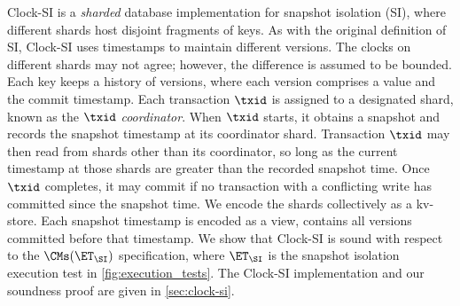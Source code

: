 Clock-SI is a \emph{sharded} database implementation for snapshot isolation (SI),
where different shards host disjoint fragments of keys.
As with the original definition of SI, Clock-SI uses timestamps to maintain different versions. 
The clocks on different shards may not agree; however, the difference is assumed to be bounded.
Each key keeps a history of versions, where each version comprises a value and the commit timestamp.
Each transaction $\txid$ is assigned to a designated shard, known as the $\txid$ \emph{coordinator}. 
When $\txid$ starts, it obtains a snapshot and records the snapshot timestamp at its coordinator shard.
Transaction $\txid$ may then read from shards other than its coordinator, so long as the current timestamp at those shards are greater than the recorded snapshot time. 
Once $\txid$ completes, it may commit if  no transaction with a conflicting write has committed since the snapshot time.
%
We encode the shards collectively as a kv-store. 
Each snapshot timestamp is encoded as a view, contains all versions committed before that timestamp.
We show that Clock-SI is sound with respect to the $\CMs(\ET_\SI)$
specification, where $\ET_\SI$ is the snapshot isolation execution test in \cref{fig:execution_tests}.
The Clock-SI implementation and our soundness proof are given in \cref{sec:clock-si}.
